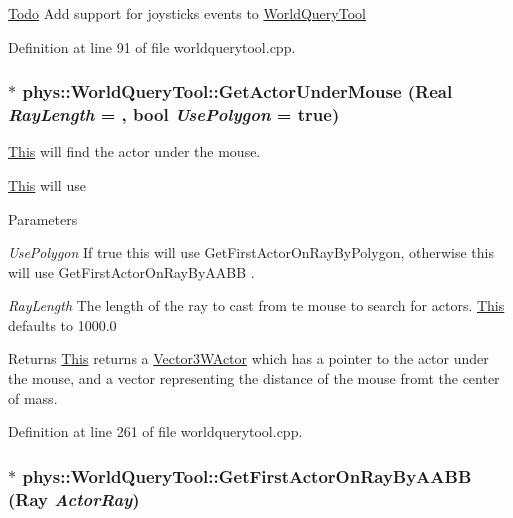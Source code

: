 \begin{Desc}
\item[\hyperlink{todo__todo000029}{Todo}]Add support for joysticks events to \hyperlink{classphys_1_1WorldQueryTool}{WorldQueryTool} \end{Desc}




Definition at line 91 of file worldquerytool.cpp.

\hypertarget{classphys_1_1WorldQueryTool_a8efba55076bad228d7cda0b82895f32a}{
\subsubsection[{GetActorUnderMouse}]{ $\ast$ phys::WorldQueryTool::GetActorUnderMouse ({\bf Real} {\em RayLength} = {}, \/  bool {\em UsePolygon} = {\ttfamily true})}}
\label{d8/d69/classphys_1_1WorldQueryTool_a8efba55076bad228d7cda0b82895f32a}


\hyperlink{structThis}{This} will find the actor under the mouse. 

\hyperlink{structThis}{This} will use 
\begin{DoxyParams}{Parameters}
\item[{\em UsePolygon}]If true this will use GetFirstActorOnRayByPolygon, otherwise this will use GetFirstActorOnRayByAABB . \item[{\em RayLength}]The length of the ray to cast from te mouse to search for actors. \hyperlink{structThis}{This} defaults to 1000.0 \end{DoxyParams}
\begin{DoxyReturn}{Returns}
\hyperlink{structThis}{This} returns a \hyperlink{classphys_1_1Vector3WActor}{Vector3WActor} which has a pointer to the actor under the mouse, and a vector representing the distance of the mouse fromt the center of mass. 
\end{DoxyReturn}


Definition at line 261 of file worldquerytool.cpp.

\hypertarget{classphys_1_1WorldQueryTool_a67575416c2e9c652bbd873649ee38baf}{
\subsubsection[{GetFirstActorOnRayByAABB}]{ $\ast$ phys::WorldQueryTool::GetFirstActorOnRayByAABB ({\bf Ray} {\em ActorRay})}}
\label{d8/d69/classphys_1_1WorldQueryTool_a67575416c2e9c652bbd873649ee38baf}


